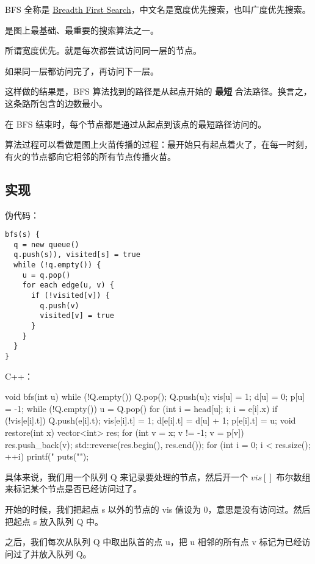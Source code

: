 
BFS 全称是 \href{https://en.wikipedia.org/wiki/Breadth-first_search}{Breadth First Search}，中文名是宽度优先搜索，也叫广度优先搜索。

是图上最基础、最重要的搜索算法之一。

所谓宽度优先。就是每次都尝试访问同一层的节点。

如果同一层都访问完了，再访问下一层。

这样做的结果是，BFS 算法找到的路径是从起点开始的 \textbf{ 最短 } 合法路径。换言之，这条路所包含的边数最小。

在 BFS 结束时，每个节点都是通过从起点到该点的最短路径访问的。

算法过程可以看做是图上火苗传播的过程：最开始只有起点着火了，在每一时刻，有火的节点都向它相邻的所有节点传播火苗。

\subsection{实现}

伪代码：

\begin{verbatim}
bfs(s) {
  q = new queue()
  q.push(s)), visited[s] = true
  while (!q.empty()) {
    u = q.pop()
    for each edge(u, v) {
      if (!visited[v]) {
        q.push(v)
        visited[v] = true
      }
    }
  }
}
\end{verbatim}

C++：

\begin{cppcode}
void bfs(int u) {
  while (!Q.empty()) Q.pop();
  Q.push(u);
  vis[u] = 1;
  d[u] = 0;
  p[u] = -1;
  while (!Q.empty()) {
    u = Q.pop() {
      for (int i = head[u]; i; i = e[i].x) {
        if (!vis[e[i].t]) {
          Q.push(e[i].t);
          vis[e[i].t] = 1;
          d[e[i].t] = d[u] + 1;
          p[e[i].t] = u;
        }
      }
    }
  }
}
void restore(int x) {
  vector<int> res;
  for (int v = x; v != -1; v = p[v]) {
    res.push_back(v);
  }
  std::reverse(res.begin(), res.end());
  for (int i = 0; i < res.size(); ++i) printf("%
  puts("");
}
\end{cppcode}

具体来说，我们用一个队列 Q 来记录要处理的节点，然后开一个 $vis[]$ 布尔数组来标记某个节点是否已经访问过了。

开始的时候，我们把起点 s 以外的节点的 vis 值设为 0，意思是没有访问过。然后把起点 s 放入队列 Q 中。

之后，我们每次从队列 Q 中取出队首的点 u，把 u 相邻的所有点 v 标记为已经访问过了并放入队列 Q。

